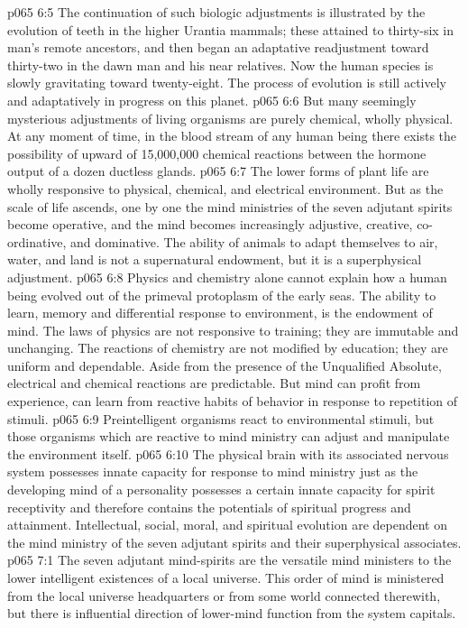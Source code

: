 \vs p065 6:5 The continuation of such biologic adjustments is illustrated by the evolution of teeth in the higher Urantia mammals; these attained to thirty\hyp{}six in man’s remote ancestors, and then began an adaptative readjustment toward thirty\hyp{}two in the dawn man and his near relatives. Now the human species is slowly gravitating toward twenty\hyp{}eight. The process of evolution is still actively and adaptatively in progress on this planet.
\vs p065 6:6 But many seemingly mysterious adjustments of living organisms are purely chemical, wholly physical. At any moment of time, in the blood stream of any human being there exists the possibility of upward of 15,000,000 chemical reactions between the hormone output of a dozen ductless glands.
\pc \vs p065 6:7 The lower forms of plant life are wholly responsive to physical, chemical, and electrical environment. But as the scale of life ascends, one by one the mind ministries of the seven adjutant spirits become operative, and the mind becomes increasingly adjustive, creative, co\hyp{}ordinative, and dominative. The ability of animals to adapt themselves to air, water, and land is not a supernatural endowment, but it is a superphysical adjustment.
\vs p065 6:8 Physics and chemistry alone cannot explain how a human being evolved out of the primeval protoplasm of the early seas. The ability to learn, memory and differential response to environment, is the endowment of mind. The laws of physics are not responsive to training; they are immutable and unchanging. The reactions of chemistry are not modified by education; they are uniform and dependable. Aside from the presence of the Unqualified Absolute, electrical and chemical reactions are predictable. But mind can profit from experience, can learn from reactive habits of behavior in response to repetition of stimuli.
\vs p065 6:9 Preintelligent organisms react to environmental stimuli, but those organisms which are reactive to mind ministry can adjust and manipulate the environment itself.
\vs p065 6:10 The physical brain with its associated nervous system possesses innate capacity for response to mind ministry just as the developing mind of a personality possesses a certain innate capacity for spirit receptivity and therefore contains the potentials of spiritual progress and attainment. Intellectual, social, moral, and spiritual evolution are dependent on the mind ministry of the seven adjutant spirits and their superphysical associates.
\vs p065 7:1 The seven adjutant mind\hyp{}spirits are the versatile mind ministers to the lower intelligent existences of a local universe. This order of mind is ministered from the local universe headquarters or from some world connected therewith, but there is influential direction of lower\hyp{}mind function from the system capitals.
